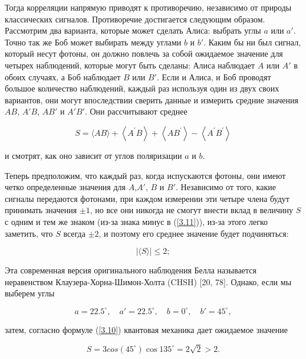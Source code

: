 \documentclass[main.tex]{subfiles}
\begin{document}
Тогда корреляции напрямую приводят к противоречию, независимо от природы классических сигналов. Противоречие достигается следующим образом. Рассмотрим два варианта, которые может сделать Алиса: выбрать углы $a$ или $a '$. Точно так же Боб может выбирать между углами $b$ и $b'$. Каким бы ни был сигнал, который несут фотоны, он должно повлечь за собой ожидаемое значение для четырех наблюдений, которые могут быть сделаны: Алиса наблюдает $A$ или $A'$ в обоих случаях, а Боб наблюдает $B$ или $B'$. Если и Алиса, и Боб проводят большое количество наблюдений, каждый раз используя один из двух своих вариантов, они могут впоследствии сверить данные и измерить средние значения $AB$, $A'B$, $AB'$ и $A'B'$. Они рассчитывают среднее

\begin{equation}\label{3.11}
	S=\langle A B\rangle+\left\langle A^{\prime} B\right\rangle+\left\langle A B^{\prime}\right\rangle-\left\langle A^{\prime} B^{\prime}\right\rangle
\end{equation}

и смотрят, как оно зависит от углов поляризации $a$ и $b$.

Теперь предположим, что каждый раз, когда испускаются фотоны, они имеют четко определенные значения для $A$,$ A '$, $B$ и $B'$. Независимо от того, какие сигналы передаются фотонами, при каждом измерении эти четыре члена будут принимать значения $\pm 1$, но все они никогда не смогут внести вклад в величину $S$ с одним и тем же знаком (из-за знака минус в (\ref{3.11})), из-за этого легко заметить, что $S$ всегда $\pm 2$, и поэтому его среднее значение будет подчиняться:

\begin{equation}\label{3.12}
	|\langle S \rangle| \leq 2;
\end{equation}
            
Эта современная версия оригинального наблюдения Белла называется неравенством Клаузера-Хорна-Шимон-Холта (CHSH) [20, 78]. Однако, если мы выберем углы

\begin{equation}\label{3.13}
	a = 22.5^\circ,\quad a'= 22.5^\circ,\quad b = 0 ^\circ,\quad b' = 45^\circ, 
\end{equation}
                                                     
затем, согласно формуле (\ref{3.10}) квантовая механика дает ожидаемое значение

\begin{equation}\label{3.14}
	S = 3cos (45^\circ) \cos 135^\circ = 2 \sqrt 2> 2.
\end{equation}
\end{document}
